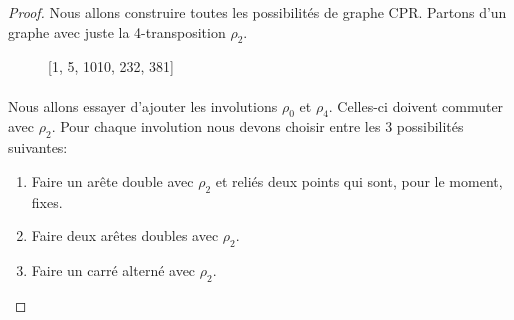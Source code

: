 \begin{proof}
  Nous allons construire toutes les possibilités de graphe CPR. Partons d'un graphe avec juste la 4-transposition $\rho_2$.

  \begin{figure}[H]
    \begin{center}
      \caption{[1, 5, 1010, 232, 381]}
    \end{center}
  \end{figure}

\paragraph{}
Nous allons essayer d'ajouter les involutions $\rho_0$ et $\rho_4$. Celles-ci doivent commuter avec $\rho_2$. Pour chaque involution nous devons choisir entre les 3 possibilités suivantes:
\begin{enumerate}
  \item Faire un arête double avec $\rho_2$ et reliés deux points qui sont, pour le moment, fixes.
  \item Faire deux arêtes doubles avec $\rho_2$.
  \item Faire un carré alterné avec $\rho_2$.
\end{enumerate}


\end{proof}
